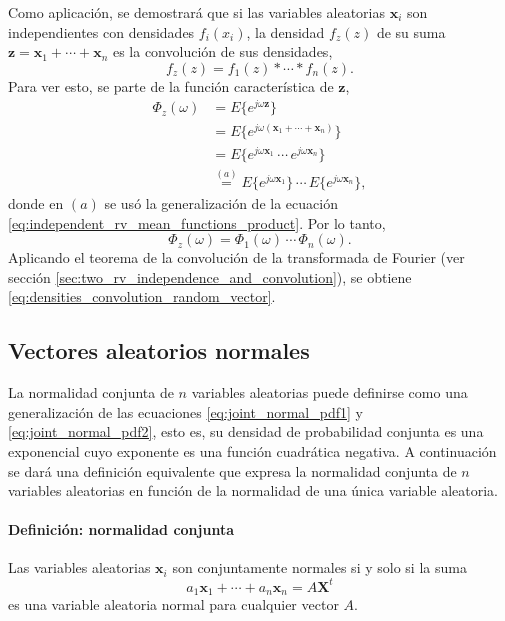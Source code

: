 \documentclass[a4paper]{report}
\newcommand{\X}{\mathbf{X}}
\newcommand{\x}{\mathbf{x}}
\newcommand{\z}{\mathbf{z}}
\begin{document}
Como aplicación, se demostrará que si las variables aleatorias \(\x_i\) son independientes con densidades \(f_i(x_i)\), la densidad \(f_z(z)\) de su suma \(\z=\x_1+\cdots+\x_n\) es la convolución de sus densidades,
\begin{equation}\label{eq:densities_convolution_random_vector}
 f_z(z)=f_1(z)*\cdots*f_n(z).
\end{equation}
Para ver esto, se parte de la función característica de \(\z\),
\begin{align*}
 \Phi_z(\omega)&=E\{e^{j\omega\z}\}\\
   &=E\{e^{j\omega(\x_1+\cdots+\x_n)}\}\\
   &=E\{e^{j\omega\x_1}\,\cdots\,e^{j\omega\x_n}\}\\
   &\overset{(a)}{=}E\{e^{j\omega\x_1}\}\,\cdots\,E\{e^{j\omega\x_n}\},
\end{align*}
donde en \((a)\) se usó la generalización de la ecuación \ref{eq:independent_rv_mean_functions_product}. Por lo tanto,
\begin{equation}\label{eq:characteristic_function_product_random_vector}
 \Phi_z(\omega)=\Phi_1(\omega)\,\cdots\,\Phi_n(\omega).
\end{equation}
Aplicando el teorema de la convolución de la transformada de Fourier (ver sección \ref{sec:two_rv_independence_and_convolution}), se obtiene \ref{eq:densities_convolution_random_vector}.

\subsection{Vectores aleatorios normales}

La normalidad conjunta de \(n\) variables aleatorias puede definirse como una generalización de las ecuaciones \ref{eq:joint_normal_pdf1} y \ref{eq:joint_normal_pdf2}, esto es, su densidad de probabilidad conjunta es una exponencial cuyo exponente es una función cuadrática negativa. A continuación se dará una definición equivalente que expresa la normalidad conjunta de \(n\) variables aleatorias en función de la normalidad de una única variable aleatoria.

\paragraph{Definición: normalidad conjunta} Las variables aleatorias \(\x_i\) son conjuntamente normales si y solo si la suma
\[
 a_1\x_1+\cdots+a_n\x_n=A\X^t
\]
es una variable aleatoria normal para cualquier vector \(A\).
\end{document}
